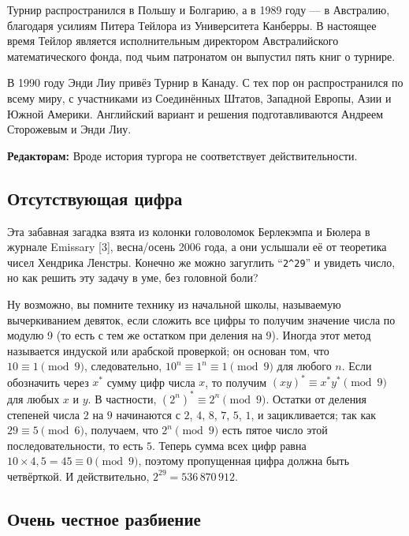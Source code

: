 Турнир распространился в Польшу и Болгарию, а в 1989 году --- в Австралию, благодаря усилиям Питера Тейлора из Университета Канберры.
В настоящее время Тейлор является исполнительным директором Австралийского математического фонда, под чьим патронатом он выпустил пять книг о турнире.

В 1990 году Энди Лиу привёз Турнир в Канаду.
С тех пор он распространился по всему миру, с участниками из Соединённых Штатов, Западной Европы, Азии и Южной Америки.
Английский вариант и решения подготавливаются Андреем Сторожевым и Энди Лиу.

\begin{addedbytheeditors}
\textbf{Редакторам:} Вроде история тургора не соответствует действительности.
\end{addedbytheeditors}

\subsection*{Отсутствующая цифра}

Эта забавная загадка взята из колонки головоломок Берлекэмпа и Бюлера в журнале Emissary [3], весна/осень 2006 года,
а они услышали её от теоретика чисел Хендрика Ленстры.
Конечно же можно загуглить ``\texttt{2\^{}29}'' и увидеть число, но как решить эту задачу в уме, без головной боли?

Ну возможно, вы помните технику из начальной школы, называемую вычеркиванием девяток, если сложить все цифры то получим значение числа по модулю 9 (то есть  с тем же остатком при деления на 9).
Иногда этот метод называется индуской или арабской проверкой;
он основан том, что $10 \equiv 1 \pmod 9$, следовательно, $10^n \equiv 1^n \equiv 1 \pmod 9$ для любого $n$.
Если обозначить через $x^*$ сумму цифр числа $x$, то получим $(xy)^* \equiv x^* y^* \pmod 9$ для любых $x$ и $y$.
В частности, $(2^n)^* \equiv 2^n \pmod 9$.
Остатки от деления степеней числа $2$ на $9$ начинаются с $2$, $4$, $8$, $7$, $5$, $1$, и зацикливается;
так как $29 \equiv 5 \pmod 6$, получаем, что $2^n \pmod 9$ есть пятое число этой последовательности, то есть $5$.
Теперь сумма всех цифр равна $10 \times 4{,}5 = 45 \equiv 0 \pmod 9$, поэтому пропущенная цифра должна быть четвёрткой.
И действительно, $2^{29} = 536\,870\,912$.

\subsection*{Очень честное разбиение}

